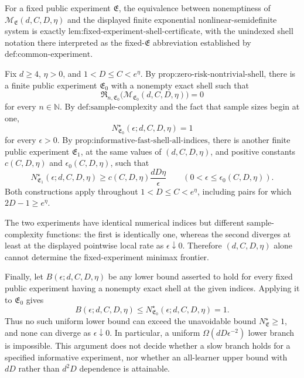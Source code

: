 For a fixed public experiment \(\mathfrak E\), the equivalence between nonemptiness of \(\mathcal M_{\mathfrak E}(d,C,D,\eta)\) and the displayed finite exponential nonlinear-semidefinite system is exactly \(\text{lem:fixed-experiment-shell-certificate}\), with the unindexed shell notation there interpreted as the fixed-\(\mathfrak E\) abbreviation established by \(\text{def:common-experiment}\).

Fix \(d\ge4\), \(\eta>0\), and \(1<D\le C<e^\eta\). By \(\text{prop:zero-risk-nontrivial-shell}\), there is a finite public experiment \(\mathfrak E_0\) with a nonempty exact shell such that
\[
\mathfrak R_{n,\mathfrak E_0}\bigl(\mathcal M_{\mathfrak E_0}(d,C,D,\eta)\bigr)=0
\]
for every \(n\in\mathbb N\). By \(\text{def:sample-complexity}\) and the fact that sample sizes begin at one,
\[
N^\star_{\mathfrak E_0}(\epsilon;d,C,D,\eta)=1
\]
for every \(\epsilon>0\). By \(\text{prop:informative-fast-shell-all-indices}\), there is another finite public experiment \(\mathfrak E_1\), at the same values of \((d,C,D,\eta)\), and positive constants \(c(C,D,\eta)\) and \(\epsilon_0(C,D,\eta)\), such that
\[
N^\star_{\mathfrak E_1}(\epsilon;d,C,D,\eta)
\ge c(C,D,\eta)\frac{dD\eta}{\epsilon}
\qquad(0<\epsilon\le\epsilon_0(C,D,\eta)).
\]
Both constructions apply throughout \(1<D\le C<e^\eta\), including pairs for which \(2D-1\ge e^\eta\).

The two experiments have identical numerical indices but different sample-complexity functions: the first is identically one, whereas the second diverges at least at the displayed pointwise local rate as \(\epsilon\downarrow0\). Therefore \((d,C,D,\eta)\) alone cannot determine the fixed-experiment minimax frontier.

Finally, let \(B(\epsilon;d,C,D,\eta)\) be any lower bound asserted to hold for every fixed public experiment having a nonempty exact shell at the given indices. Applying it to \(\mathfrak E_0\) gives
\[
B(\epsilon;d,C,D,\eta)
\le N^\star_{\mathfrak E_0}(\epsilon;d,C,D,\eta)=1.
\]
Thus no such uniform lower bound can exceed the unavoidable bound \(N^\star_{\mathfrak E}\ge1\), and none can diverge as \(\epsilon\downarrow0\). In particular, a uniform \(\Omega(dD\epsilon^{-2})\) lower branch is impossible. This argument does not decide whether a slow branch holds for a specified informative experiment, nor whether an all-learner upper bound with \(dD\) rather than \(d^2D\) dependence is attainable.